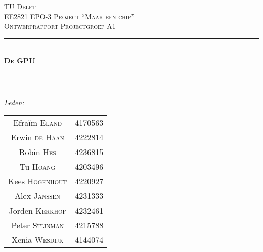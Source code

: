 \documentclass[12pt]{scrreprt}
\begin{document}
\begin{titlepage}

\newcommand{\HRule}{\rule{\linewidth}{0.5mm}} %

\center %
 

\textsc{\LARGE TU Delft}\\[1.5cm] %
\textsc{\Large EE2821 EPO-3 Project ``Maak een chip''}\\[0.5cm] %
\textsc{\large Ontwerprapport Projectgroep A1}\\[0.5cm] %


\HRule \\[0.4cm]
\textsc{\huge \bfseries De GPU}\\[0.2cm] %
\HRule \\[1.5cm]
 

\begin{minipage}{0.4\textwidth}
\begin{flushleft} \large
\emph{Leden:}\\
\begin{tabular}{cc}
Efraïm \textsc{Eland} & 4170563 \\
Erwin \textsc{de Haan} & 4222814\\
Robin \textsc{Hes}& 4236815\\
Tu \textsc{Hoang} &4203496 \\
Kees \textsc{Hogenhout} & 4220927\\
Alex \textsc{Janssen} &	4231333\\
Jorden \textsc{Kerkhof} & 4232461\\
Peter \textsc{Stijnman} & 4215788 \\
Xenia \textsc{Wesdijk} & 4144074\\
\end{tabular}


\end{flushleft}
\end{minipage}
\end{titlepage}
\end{document}
